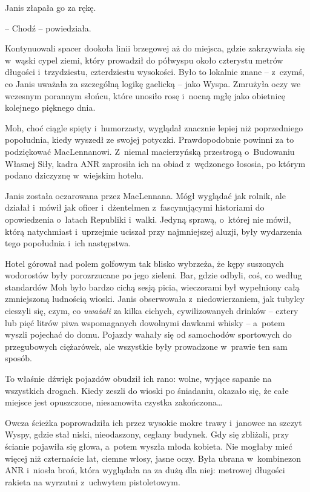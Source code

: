 \documentclass[oneside,polish,11pt,sfheadings]{mwbk}
\begin{document}
Janis złapała go za rękę. 

-- Chodź -- powiedziała.

Kontynuowali spacer dookoła linii brzegowej aż do miejsca, gdzie
zakrzywiała się w~wąski cypel ziemi, który prowadził do półwyspu około
czterystu metrów długości i~trzydziestu, czterdziestu wysokości. Było to
lokalnie znane -- z~czymś, co Janis uważała za szczególną logikę gaelicką
-- jako Wyspa. Zmrużyła oczy we wczesnym porannym słońcu, które unosiło
rosę i~nocną mgłę jako obietnicę kolejnego pięknego dnia.

Moh, choć ciągle spięty i~humorzasty, wyglądał znacznie lepiej niż
poprzedniego popołudnia, kiedy wyszedł ze swojej potyczki.
Prawdopodobnie powinni za to podziękować MacLennanowi. Z~niemal
macierzyńską przestrogą o~Budowaniu Własnej Siły, kadra ANR zaprosiła
ich na obiad z~wędzonego łososia, po którym podano dziczyznę w~wiejskim
hotelu.

Janis została oczarowana przez MacLennana. Mógł wyglądać jak rolnik, ale
działał i~mówił jak oficer i~dżentelmen z~fascynującymi historiami do
opowiedzenia o~latach Republiki i~walki. Jedyną sprawą, o~której nie
mówił, którą natychmiast i~uprzejmie uciszał przy najmniejszej aluzji,
były wydarzenia tego popołudnia i~ich następstwa.

Hotel górował nad polem golfowym tak blisko wybrzeża, że kępy suszonych
wodorostów były porozrzucane po jego zieleni. Bar, gdzie odbyli, coś, co
według standardów Moh było bardzo cichą sesją picia, wieczorami był
wypełniony całą zmniejszoną ludnością wioski. Janis obserwowała z~niedowierzaniem, jak tubylcy cieszyli się, czym, co \emph{uważali} za
kilka cichych, cywilizowanych drinków -- cztery lub pięć litrów piwa
wspomaganych dowolnymi dawkami whisky -- a~potem wyszli pojechać do domu.
Pojazdy wahały się od samochodów sportowych do przegubowych ciężarówek,
ale wszystkie były prowadzone w~prawie ten sam sposób.

To właśnie dźwięk pojazdów obudził ich rano: wolne, wyjące sapanie na
wszystkich drogach. Kiedy zeszli do wioski po śniadaniu, okazało się, że
całe miejsce jest opuszczone, niesamowita czystka zakończona\ldots

Owcza ścieżka poprowadziła ich przez wysokie mokre trawy i~janowce na
szczyt Wyspy, gdzie stał niski, nieodaszony, ceglany budynek. Gdy się
zbliżali, przy ścianie pojawiła się głowa, a~potem wyszła młoda kobieta.
Nie mogłaby mieć więcej niż czternaście lat, ciemne włosy, jasne oczy.
Była ubrana w~kombinezon ANR i~niosła broń, która wyglądała na za dużą
dla niej: metrowej długości rakieta na wyrzutni z~uchwytem pistoletowym.
\end{document}
